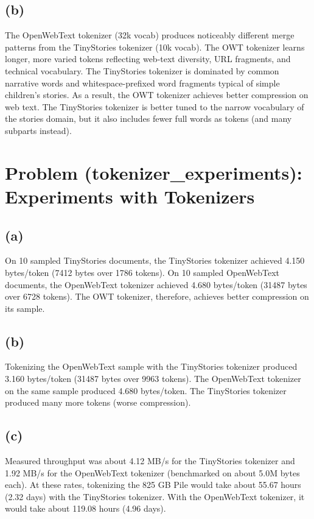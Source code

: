 \documentclass[11pt]{article}
\begin{document}
\subsection*{(b)}
The OpenWebText tokenizer (32k vocab) produces noticeably different merge patterns from the TinyStories tokenizer (10k vocab). The OWT tokenizer learns longer, more varied tokens reflecting web-text diversity, URL fragments, and technical vocabulary. The TinyStories tokenizer is dominated by common narrative words and whitespace-prefixed word fragments typical of simple children's stories. As a result, the OWT tokenizer achieves better compression on web text. The TinyStories tokenizer is better tuned to the narrow vocabulary of the stories domain, but it also includes fewer full words as tokens (and many subparts instead).

\section{Problem (tokenizer\_experiments): Experiments with Tokenizers}
\subsection*{(a)}
On 10 sampled TinyStories documents, the TinyStories tokenizer achieved 4.150 bytes/token (7412 bytes over 1786 tokens). On 10 sampled OpenWebText documents, the OpenWebText tokenizer achieved 4.680 bytes/token (31487 bytes over 6728 tokens). The OWT tokenizer, therefore, achieves better compression on its sample.

\subsection*{(b)}
Tokenizing the OpenWebText sample with the TinyStories tokenizer produced 3.160 bytes/token (31487 bytes over 9963 tokens). The OpenWebText tokenizer on the same sample produced 4.680 bytes/token. The TinyStories tokenizer produced many more tokens (worse compression).

\subsection*{(c)}
Measured throughput was about 4.12 MB/s for the TinyStories tokenizer and 1.92 MB/s for the OpenWebText tokenizer (benchmarked on about 5.0M bytes each). At these rates, tokenizing the 825 GB Pile would take about 55.67 hours (2.32 days) with the TinyStories tokenizer. With the OpenWebText tokenizer, it would take about 119.08 hours (4.96 days).
\end{document}
